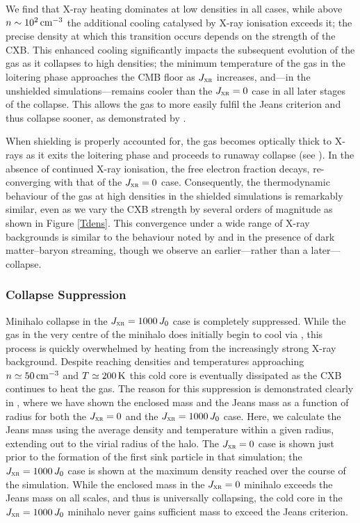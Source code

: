 \documentclass[../thesis.tex]{subfiles}
\begin{document}
We find that X-ray heating dominates at low densities in all cases, while above $n\sim10^2\cc$ the additional cooling catalysed by X-ray ionisation exceeds it; the precise density at which this transition occurs depends on the strength of the CXB.  This enhanced cooling significantly impacts the subsequent evolution of the gas as it collapses to high densities; the minimum temperature of the gas in the loitering phase approaches the CMB floor as $\jxr$ increases, and---in the unshielded simulations---remains cooler than the $\jxr=0$ case in all later stages of the collapse. This allows the gas to more easily fulfil the Jeans criterion and thus collapse sooner, as demonstrated by .

When shielding is properly accounted for, the gas becomes optically thick to X-rays as it exits the loitering phase and proceeds to runaway collapse (see ).  In the absence of continued X-ray ionisation, the free electron fraction decays, re-converging with that of the $\jxr=0$ case.  Consequently, the thermodynamic behaviour of the gas at high densities in the shielded simulations is remarkably similar, even as we vary the CXB strength by several orders of magnitude as shown in Figure \ref{Tdens}. This convergence under a wide range of X-ray backgrounds is similar to the behaviour noted by \citet{StacyBrommLoeb2011a} and \citet{Greifetal2011b} in the presence of dark matter--baryon streaming, though we observe an earlier---rather than a later---collapse.

\subsubsection{Collapse Suppression}
 \label{suppression}
Minihalo collapse in the $\jxr = 1000\,J_0$ case is completely suppressed.  While the gas in the very centre of the minihalo does initially begin to cool via \htwo, this process is quickly overwhelmed by heating from the increasingly strong X-ray background.  Despite reaching densities and temperatures approaching $n \simeq 50\cc$ and $T \simeq 200\kelvin$ this cold core is eventually dissipated as the CXB continues to heat the gas. 
The reason for this suppression is demonstrated clearly in , where we have shown the enclosed mass and the Jeans mass as a function of radius for both the $\jxr = 0$ and the $\jxr = 1000\,J_0$ case. Here, we calculate the Jeans mass using the average density and temperature within a given radius, extending out to the virial radius of the halo.  The $\jxr = 0$ case is shown just prior to the formation of the first sink particle in that simulation; the $\jxr = 1000\,J_0$ case is shown at the maximum density reached over the course of the simulation.  While the enclosed mass in the $\jxr = 0$ minihalo exceeds the Jeans mass on all scales, and thus is universally collapsing, the cold core in the $\jxr = 1000\,J_0$ minihalo never gains sufficient mass to exceed the Jeans criterion.
\end{document}
